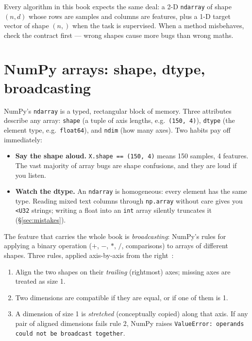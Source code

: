 \begin{principle}
Every algorithm in this book expects the same deal: a 2-D \texttt{ndarray} of
shape $(n,d)$ whose rows are samples and columns are features, plus a 1-D
target vector of shape $(n,)$ when the task is supervised. When a method
misbehaves, check the contract first --- wrong shapes cause more bugs than
wrong maths.
\end{principle}

\section{NumPy arrays: shape, dtype, broadcasting}\label{sec:numpy}

NumPy's \texttt{ndarray} is a typed, rectangular block of
memory. Three attributes describe any array: \texttt{shape} (a tuple of axis
lengths, e.g.\ \texttt{(150, 4)}), \texttt{dtype} (the element type, e.g.\
\texttt{float64}), and \texttt{ndim} (how many axes). Two habits pay off
immediately:

\begin{itemize}
\item \textbf{Say the shape aloud.} \texttt{X.shape == (150, 4)} means 150
  samples, 4 features. The vast majority of array bugs are shape confusions,
  and they are loud if you listen.
\item \textbf{Watch the dtype.} An \texttt{ndarray} is
  homogeneous: every element has the same type. Reading mixed text columns
  through \texttt{np.array} without care gives you \texttt{<U32} strings;
  writing a float into an \texttt{int} array silently truncates it
  (\S\ref{sec:mistakes}).
\end{itemize}

The feature that carries the whole book is
\emph{broadcasting}: NumPy's rules for applying a binary
operation ($+$, $-$, $*$, $/$, comparisons) to arrays of different shapes.
Three rules, applied axis-by-axis from the right~\cite{npbroadcast}:

\begin{rulebox}
\begin{enumerate}
\item Align the two shapes on their \emph{trailing} (rightmost) axes; missing
  axes are treated as size 1.
\item Two dimensions are compatible if they are equal, or if one of them is 1.
\item A dimension of size 1 is \emph{stretched} (conceptually copied) along
  that axis. If any pair of aligned dimensions fails rule 2, NumPy raises
  \texttt{ValueError: operands could not be broadcast together}.
\end{enumerate}
\end{rulebox}

